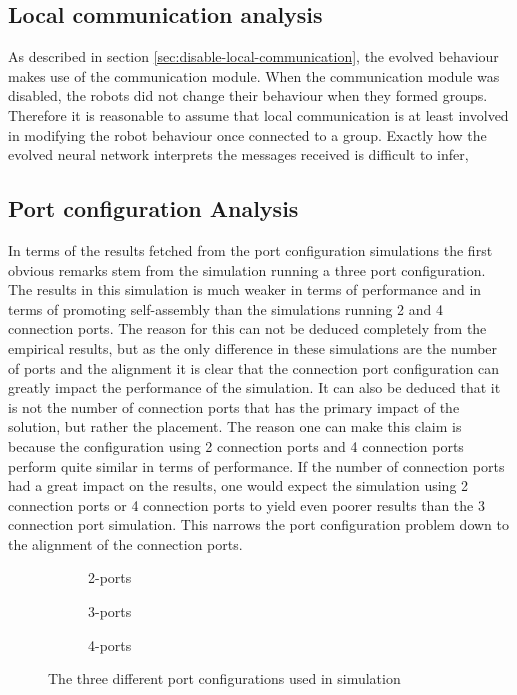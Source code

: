 \subsection{Local communication analysis}
As described in section \ref{sec:disable-local-communication}, the evolved behaviour makes use of the communication module.
When the communication module was disabled, the robots did not change their behaviour when they formed groups.
Therefore it is reasonable to assume that local communication is at least involved in modifying the robot behaviour once connected to a group.
Exactly how the evolved neural network interprets the messages received is difficult to infer, 


\subsection{Port configuration Analysis}
In terms of the results fetched from the port configuration simulations the first obvious remarks stem from the simulation running a three port configuration.
The results in this simulation is much weaker in terms of performance and in terms of promoting self-assembly than the simulations running 2 and 4 connection ports.
The reason for this can not be deduced completely from the empirical results, but as the only difference in these simulations are the number of ports and the alignment it is clear that the connection port configuration can greatly impact the performance of the simulation.
It can also be deduced that it is not the number of connection ports that has the primary impact of the solution, but rather the placement.
The reason one can make this claim is because the configuration using 2 connection ports and 4 connection ports perform quite similar in terms of performance.
If the number of connection ports had a great impact on the results, one would expect the simulation using 2 connection ports or 4 connection ports to yield even poorer results than the 3 connection port simulation.
This narrows the port configuration problem down to the alignment of the connection ports.

\begin{figure}[H]
	\centering
	\begin{subfigure}[b]{0.31\textwidth}
		\centering
		\caption{2-ports}
	\end{subfigure}
	\begin{subfigure}[b]{0.31\textwidth}
		\centering
		\caption{3-ports}
	\end{subfigure}
	\begin{subfigure}[b]{0.31\textwidth}
		\centering
		\caption{4-ports}
	\end{subfigure}
	\caption{The three different port configurations used in simulation}
	\label{fig:robot-port-configuration}
\end{figure}

